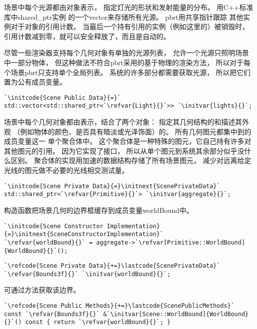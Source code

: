 场景中每个光源都由对象表示，
指定灯光的形状和发射能量的分布。
用C++标准库中{\ttfamily shared\_ptr}实例
的一个{\ttfamily vector}来存储所有光源。
pbrt用共享指针跟踪
其他实例对于对象的引用计数。
当最后一个持有引用的实例（例如这里的）被销毁时，
引用计数减到零，就可以安全释放了，而且是自动的。

尽管一些渲染器支持每个几何对象有单独的光源列表，
允许一个光源只照明场景中一部分物体，
但这种做法不符合pbrt采用的基于物理的渲染方法，
所以对于每个场景pbrt只支持单个全局列表。
系统的许多部分都需要获取光源，
所以把它们置为公有成员变量。
\begin{lstlisting}
`\initcode{Scene Public Data}{=}`
std::vector<std::shared_ptr<`\refvar{Light}{}`>> `\initvar{lights}{}`;
\end{lstlisting}

场景中每个几何对象都由表示，结合了两个对象：
指定其几何结构的和描述其外观
（例如物体的颜色、是否具有暗淡或光泽饰面）的。
所有几何图元都集中到的
成员变量这一
单个聚合体中。
这个聚合体是一种特殊的图元，它自己持有许多对其他图元的引用。
因为它实现了接口，
所以从单个图元到系统其余部分似乎没什么区别。
聚合体的实现用加速的数据结构存储了所有场景图元，
减少对远离给定光线的图元做不必要的光线相交测试量。
\begin{lstlisting}
`\initcode{Scene Private Data}{=}\initnext{ScenePrivateData}`
std::shared_ptr<`\refvar{Primitive}{}`> `\initvar{aggregate}{}`;
\end{lstlisting}
构造函数把场景几何的边界框缓存到成员变量{\ttfamily worldBound}中。
\begin{lstlisting}
`\initcode{Scene Constructor Implementation}{=}\initnext{SceneConstructorImplementation}`
`\refvar{worldBound}{}` = aggregate->`\refvar[Primitive::WorldBound]{WorldBound}{}`();
\end{lstlisting}
\begin{lstlisting}
`\refcode{Scene Private Data}{+=}\lastcode{ScenePrivateData}`
`\refvar{Bounds3f}{}` `\initvar{worldBound}{}`;
\end{lstlisting}
可通过方法获取该边界。
\begin{lstlisting}
`\refcode{Scene Public Methods}{+=}\lastcode{ScenePublicMethods}`
const `\refvar{Bounds3f}{}` &`\initvar[Scene::WorldBound]{WorldBound}{}`() const { return `\refvar{worldBound}{}`; }
\end{lstlisting}

